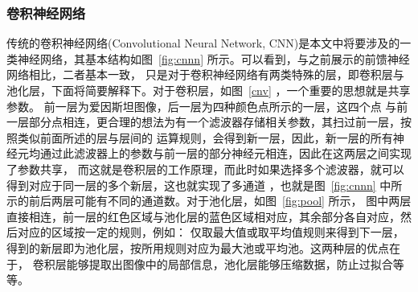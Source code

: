 \documentclass[aps,pre,12pt,preprint,onecolumn,showpacs,showkeys]{revtex4-1}
\begin{document}
\subsubsection{卷积神经网络}
传统的卷积神经网络(Convolutional Neural 
Network, CNN)是本文中将要涉及的一类神经网络，其基本结构如图~\ref{fig:cnnn} 所示。可以看到，与之前展示的前馈神经网络相比，二者基本一致，
只是对于卷积神经网络有两类特殊的层，即卷积层与池化层，下面将简要解释下。对于卷积层，如图~\ref{cnv} ，一个重要的思想就是共享参数。
前一层为爱因斯坦图像，后一层为四种颜色点所示的一层，这四个点
与前一层部分点相连，更合理的想法为有一个滤波器存储相关参数，其扫过前一层，按照类似前面所述的层与层间的
运算规则，会得到新一层，因此，新一层的所有神经元均通过此滤波器上的参数与前一层的部分神经元相连，因此在这两层之间实现了参数共享，
而这就是卷积层的工作原理，而此时如果选择多个滤波器，就可以得到对应于同一层的多个新层，这也就实现了多通道
，也就是图~\ref{fig:cnnn} 中所示的前后两层可能有不同的通道数。对于池化层，如图~\ref{fig:pool} 所示，
图中两层直接相连，前一层的红色区域与池化层的蓝色区域相对应，其余部分各自对应，然后对应的区域按一定的规则，例如：
仅取最大值或取平均值规则来得到下一层，得到的新层即为池化层，按所用规则对应为最大池或平均池。这两种层的优点在于，
卷积层能够提取出图像中的局部信息，池化层能够压缩数据，防止过拟合等等。
\end{document}
